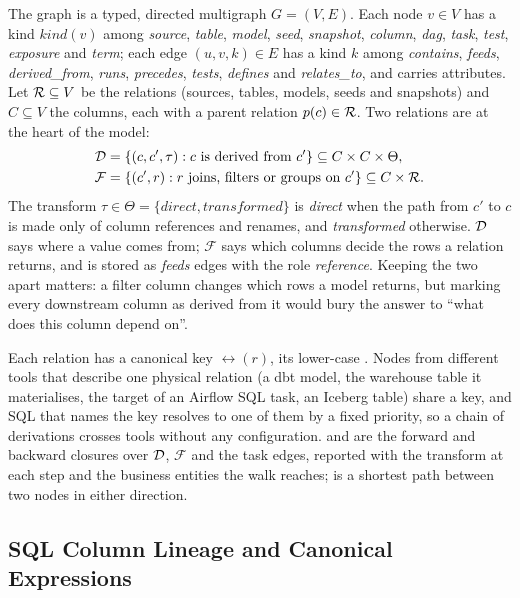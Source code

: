 The graph is a typed, directed multigraph $G = (V, E)$. Each node $v \in V$ has a kind
$\mathit{kind}(v)$ among \emph{source}, \emph{table}, \emph{model}, \emph{seed}, \emph{snapshot},
\emph{column}, \emph{dag}, \emph{task}, \emph{test}, \emph{exposure} and \emph{term}; each edge
$(u, v, k) \in E$ has a kind $k$ among \emph{contains}, \emph{feeds}, \emph{derived\_from},
\emph{runs}, \emph{precedes}, \emph{tests}, \emph{defines} and \emph{relates\_to}, and carries
attributes. Let $\mathcal{R} \subseteq V$ be the relations (sources, tables, models, seeds and snapshots)
and $C \subseteq V$ the columns, each with a parent relation $p(c) \in \mathcal{R}$. Two relations are at
the heart of the model:
\begin{align}
  \mathcal{D} &= \{(c, c', \tau) : c \text{ is derived from } c'\} \subseteq C \times C \times \Theta, \label{eq:lineage}\\
  \mathcal{F} &= \{(c', r) : r \text{ joins, filters or groups on } c'\} \subseteq C \times \mathcal{R}. \label{eq:refs}
\end{align}
The transform $\tau \in \Theta = \{\textit{direct}, \textit{transformed}\}$ is \emph{direct} when the path from $c'$ to $c$ is made only of column
references and renames, and \emph{transformed} otherwise. $\mathcal{D}$ says where a value comes from;
$\mathcal{F}$ says which columns decide the rows a relation returns, and is stored as
\emph{feeds} edges with the role \emph{reference}. Keeping the two apart matters: a filter column
changes which rows a model returns, but marking every downstream column as derived from it would
bury the answer to ``what does this column depend on''.

Each relation has a canonical key $\rel(r)$, its lower-case . Nodes from
different tools that describe one physical relation (a dbt model, the warehouse table it
materialises, the target of an Airflow SQL task, an Iceberg table) share a key, and SQL that names
the key resolves to one of them by a fixed priority, so a chain of derivations crosses tools
without any configuration.  and  are the forward and backward closures
over $\mathcal{D}$, $\mathcal{F}$ and the task edges, reported with the transform at each step and the
business entities the walk reaches;  is a shortest path between two nodes in either
direction.

\subsection{SQL Column Lineage and Canonical Expressions}
\label{sec:sql}

